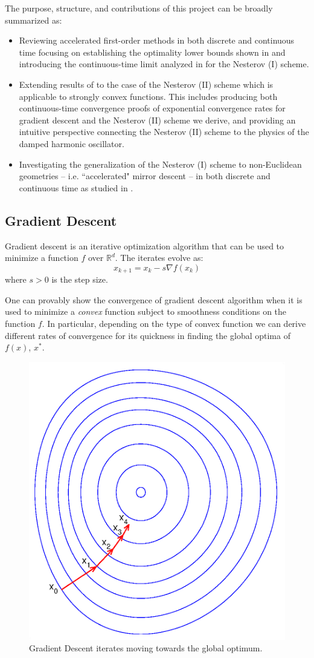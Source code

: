The purpose, structure, and contributions of this project can be broadly summarized as:
\begin{itemize}
    \item Reviewing accelerated first-order methods in both discrete and continuous time focusing on establishing the optimality lower bounds shown in \citet{nesterov2004introductory} and introducing the continuous-time limit analyzed in \citet{su2014differential} for the Nesterov (I) scheme.
    \item Extending results of \citet{su2014differential} to the case of the Nesterov (II) scheme which is applicable to strongly convex functions. This includes producing both continuous-time convergence proofs of exponential convergence rates for gradient descent and the Nesterov (II) scheme we derive, and providing an intuitive perspective connecting the Nesterov (II) scheme to the physics of the damped harmonic oscillator.
    \item Investigating the generalization of the Nesterov (I) scheme to non-Euclidean geometries -- i.e. ``accelerated" mirror descent -- in both discrete and continuous time as studied in \citet{krichene2015accelerated}.
\end{itemize}

\subsection{Gradient Descent}

Gradient descent is an iterative optimization algorithm that can be used to minimize a function $f$ over $\mathbb{R}^{d}$. The iterates evolve as:
\begin{equation}
    x_{k+1} = x_k - s \nabla f(x_k)
\end{equation}
where $s > 0$ is the step size. 

One can provably show the convergence of gradient descent algorithm when it is used to minimize a \textit{convex} function subject to smoothness conditions on the function $f$. In particular, depending on the type of convex function we can derive different rates of convergence for its quickness in finding the global optima of $f(x)$, $x^*$. 

\begin{figure}[!h]
\begin{center}
\includegraphics[width=0.2\linewidth]{SourceFiles/plots/Gradient_descent.eps}
\caption{Gradient Descent iterates moving towards the global optimum.}
\end{center}
\end{figure}

